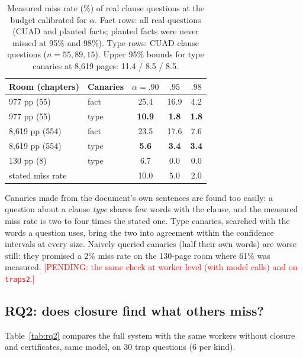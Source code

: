 \documentclass[11pt]{article}
\newcommand{\pending}[1]{\textcolor{red}{[PENDING: #1]}}   %
\begin{document}
\begin{table}[t]
\centering\small
\setlength{\tabcolsep}{3pt}
\begin{tabular}{llccc}
\toprule
Room (chapters) & Canaries & $\alpha{=}.90$ & $.95$ & $.98$ \\
\midrule
977 pp (55) & fact & 25.4 & 16.9 & 4.2 \\
977 pp (55) & type & \textbf{10.9} & \textbf{1.8} & \textbf{1.8} \\
8,619 pp (554) & fact & 23.5 & 17.6 & 7.6 \\
8,619 pp (554) & type & \textbf{5.6} & \textbf{3.4} & \textbf{3.4} \\
130 pp (8) & type & 6.7 & 0.0 & 0.0 \\
\midrule
\multicolumn{2}{l}{stated miss rate} & 10.0 & 5.0 & 2.0 \\
\bottomrule
\end{tabular}
\caption{Measured miss rate (\%) of real clause questions at the budget calibrated for $\alpha$. Fact rows: all real questions (CUAD and planted facts; planted facts were never missed at 95\% and 98\%). Type rows: CUAD clause questions ($n = 55, 89, 15$). Upper 95\% bounds for type canaries at 8,619 pages: 11.4 / 8.5 / 8.5.}
\label{tab:rq1}
\end{table}

Canaries made from the document's own sentences are found too easily: a question about a clause \emph{type} shares few words with the clause, and the measured miss rate is two to four times the stated one. Type canaries, searched with the words a question uses, bring the two into agreement within the confidence intervals at every size. Naively queried canaries (half their own words) are worse still: they promised a 2\% miss rate on the 130-page room where 61\% was measured. \pending{the same check at worker level (with model calls) and on \texttt{traps2}.}

\subsection{RQ2: does closure find what others miss?}
Table~\ref{tab:rq2} compares the full system with the same workers without closure and certificates, same model, on 30 trap questions (6 per kind).
\end{document}
